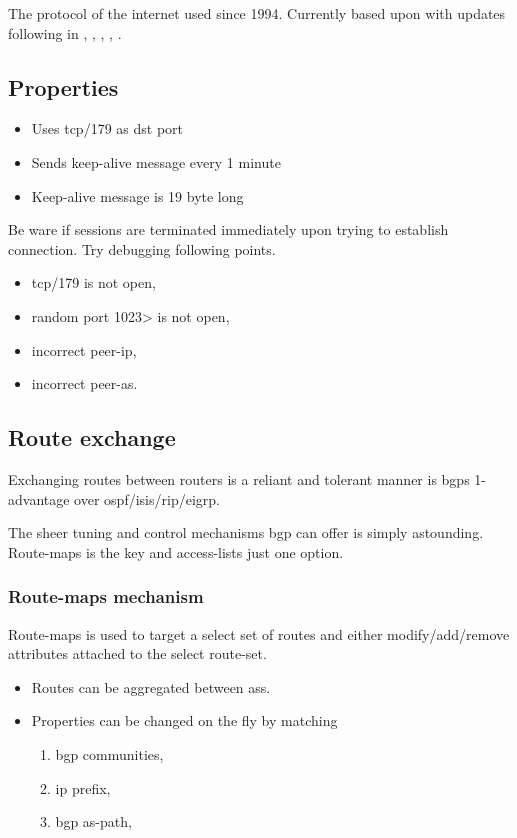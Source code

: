 
The protocol of the internet used since 1994.\cite{wiki:Border_Gateway_Protocol}
Currently based upon  with updates following in  , , , , .

\subsection{Properties}

\begin{itemize}
    \item Uses tcp/179 as \gls{dst} port
    \item Sends keep-alive message every 1 minute
    \item Keep-alive message is 19 byte long
\end{itemize}

Be ware if sessions are terminated immediately upon trying to establish connection. Try debugging following points.

\begin{itemize}
    \item tcp/179 is not open,
    \item random port 1023> is not open,
    \item incorrect peer-ip,
    \item incorrect peer-as.
\end{itemize}

\subsection{Route exchange}

Exchanging routes between routers is a reliant and tolerant manner is \glspl{bgp} 1-advantage over \gls{ospf}/\gls{isis}/\gls{rip}/\gls{eigrp}.

The sheer tuning and control mechanisms \gls{bgp} can offer is simply astounding. Route-maps is the key and access-lists just one option.

\subsubsection[Route-maps]{Route-maps mechanism}

Route-maps is used to target a select set of routes and either modify/add/remove attributes attached to the select route-set.

\begin{itemize}
    \item Routes can be aggregated between \glspl{as}.
    \item Properties can be changed on the fly by matching
    \begin{enumerate}[label={\alph*)}]
        \item \Gls{bgp} communities,
        \item \Gls{ip} prefix,
        \item \Gls{bgp} as-path, 
    \end{enumerate}
\end{itemize}

